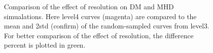 \begin{figure}[!ht]
  \centering
  \hfill
  \caption{Comparison of the effect of resolution on DM and MHD simualations. Here level4 curves (magenta) are compared to the mean and 2std (confirm) of the random-sampled curves from level3. For better comparison of the effect of resolution, the difference percent is plotted in green.}
  \label{fig:convergence}  
\end{figure}

